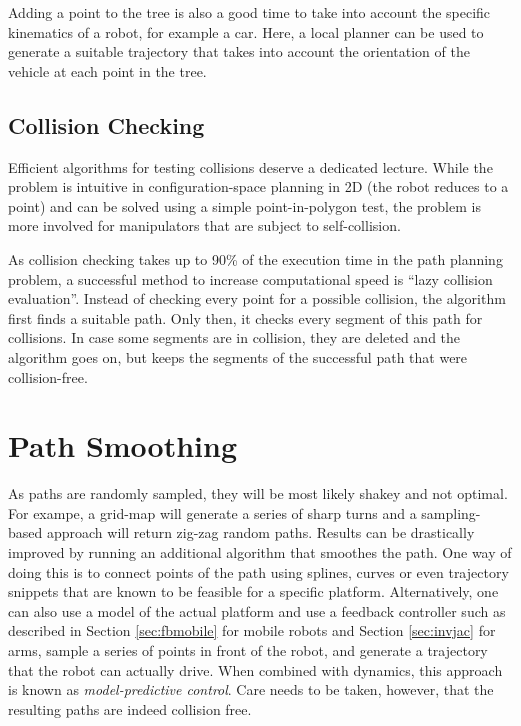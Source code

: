 Adding a point to the tree is also a good time to take into account the specific kinematics of a robot, for example a car. Here, a local planner can be used to generate a suitable trajectory that takes into account the orientation of the vehicle at each point in the tree.

\subsection{Collision Checking}
Efficient algorithms for testing collisions deserve a dedicated lecture. While the problem is intuitive in configuration-space planning in 2D (the robot reduces to a point) and can be solved using a simple point-in-polygon test, the problem is more involved for manipulators that are subject to self-collision.

As collision checking takes up to 90\% of the execution time in the path planning problem, a successful method to increase computational speed is ``lazy collision evaluation''. Instead of checking every point for a possible collision, the algorithm first finds a suitable path. Only then, it checks every segment of this path for collisions. In case some segments are in collision, they are deleted and the algorithm goes on, but keeps the segments of the successful path that were collision-free.

\section{Path Smoothing}
As paths are randomly sampled, they will be most likely shakey and not optimal. For exampe, a grid-map will generate a series of sharp turns and a sampling-based approach will return zig-zag random paths. Results can be drastically improved by running an additional algorithm that smoothes the path. One way of doing this is to connect points of the path using splines, curves or even trajectory snippets that are known to be feasible for a specific platform. Alternatively, one can also use a model of the actual platform and use a feedback controller such as described in Section \ref{sec:fbmobile} for mobile robots and Section \ref{sec:invjac} for arms, sample a series of points in front of the robot, and generate a trajectory that the robot can actually drive. When combined with dynamics, this approach is known as \emph{model-predictive control}. Care needs to be taken, however, that the resulting paths are indeed collision free.

